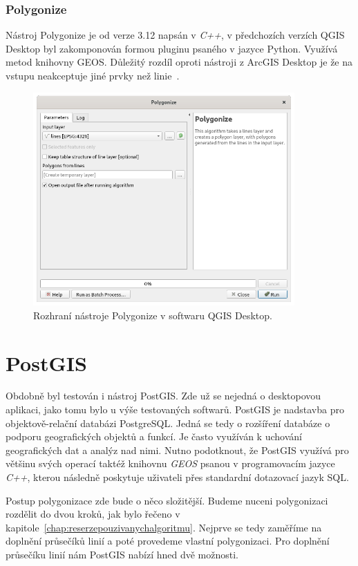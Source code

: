 \subsubsection{Polygonize}
Nástroj Polygonize je od verze 3.12 napsán v \textit{C++}, v předchozích verzích QGIS Desktop byl zakomponován formou pluginu psaného v jazyce Python. Využívá metod knihovny GEOS. Důležitý rozdíl oproti nástroji z ArcGIS Desktop je že na vstupu neakceptuje jiné prvky než linie~\cite{QGIS_software}.

\begin{figure}[h]
  \centering
  \includegraphics[width=10cm]{./pictures/5_1/polygonize.png}
  \caption{Rozhraní nástroje Polygonize v softwaru QGIS Desktop.}
  \label{fig:polygonize}
\end{figure}

\section{PostGIS}
	Obdobně byl testován i nástroj PostGIS. Zde už se nejedná o desktopovou aplikaci, jako tomu bylo u výše testovaných softwarů. PostGIS je nadstavba pro objektově-relační databázi PostgreSQL. Jedná se tedy o rozšíření databáze o podporu geo\-grafických objektů a funkcí. Je často využíván k uchování geografických dat a analýz nad nimi. Nutno podotknout, že PostGIS využívá pro většinu svých o\-pe\-ra\-cí taktéž knihovnu \textit{GEOS} psanou v programovacím jazyce \textit{C++}, kterou následně poskytuje uživateli přes standardní dotazovací jazyk SQL.
	
	Postup polygonizace zde bude o něco složitější. Budeme nuceni polygonizaci rozdělit do dvou kroků, jak bylo řečeno v kapitole~\ref{chap:reserzepouzivanychalgoritmu}. Nejprve se tedy zaměříme na doplnění průsečíků linií a poté provedeme vlastní polygonizaci. Pro doplnění průsečíku linií nám PostGIS nabízí hned dvě možnosti.
	

